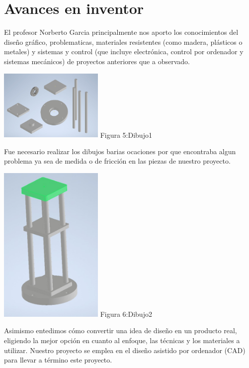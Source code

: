 \documentclass[12pt,a4paper]{report}
\begin{document}
\section{Avances en inventor}
El profesor Norberto Garcia principalmente nos aporto los conocimientos del diseño gráfico, problematicas, materiales resistentes (como madera, plásticos o metales) y sistemas y control (que incluye electrónica, control por ordenador y sistemas mecánicos) de proyectos anteriores que a observado.\\
\begin{center}
\includegraphics[width=5cm]{Dibujo1.jpeg}
 Figura 5:Dibujo1
\end{center}
Fue necesario realizar los dibujos barias ocaciones por que encontraba algun problema ya sea de medida o de fricción en las piezas de nuestro proyecto.\\
\begin{center}
\includegraphics[width=5cm]{Dibujo2.jpeg}
 Figura 6:Dibujo2
\end{center}
Asimismo entedimos cómo convertir una idea de diseño en un producto real, eligiendo la mejor opción en cuanto al enfoque, las técnicas y los materiales a utilizar. Nuestro proyecto se emplea en el diseño asistido por ordenador (CAD) para llevar a término este proyecto.
\end{document}
